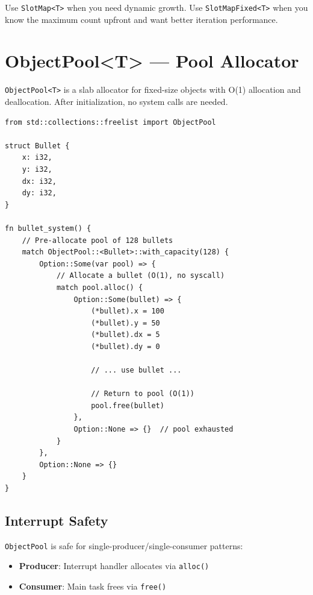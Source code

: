 \begin{notebox}
Use \texttt{SlotMap<T>} when you need dynamic growth. Use \texttt{SlotMapFixed<T>} when you know the maximum count upfront and want better iteration performance.
\end{notebox}

\section{ObjectPool<T> --- Pool Allocator}
\label{sec:objectpool}

\texttt{ObjectPool<T>} is a slab allocator for fixed-size objects with O(1) allocation and deallocation. After initialization, no system calls are needed.

\begin{lstlisting}
from std::collections::freelist import ObjectPool

struct Bullet {
    x: i32,
    y: i32,
    dx: i32,
    dy: i32,
}

fn bullet_system() {
    // Pre-allocate pool of 128 bullets
    match ObjectPool::<Bullet>::with_capacity(128) {
        Option::Some(var pool) => {
            // Allocate a bullet (O(1), no syscall)
            match pool.alloc() {
                Option::Some(bullet) => {
                    (*bullet).x = 100
                    (*bullet).y = 50
                    (*bullet).dx = 5
                    (*bullet).dy = 0

                    // ... use bullet ...

                    // Return to pool (O(1))
                    pool.free(bullet)
                },
                Option::None => {}  // pool exhausted
            }
        },
        Option::None => {}
    }
}
\end{lstlisting}

\subsection{Interrupt Safety}

\texttt{ObjectPool} is safe for single-producer/single-consumer patterns:
\begin{itemize}
    \item \textbf{Producer}: Interrupt handler allocates via \texttt{alloc()}
    \item \textbf{Consumer}: Main task frees via \texttt{free()}
\end{itemize}

